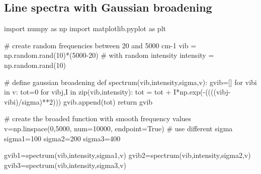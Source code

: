 \documentclass[
  letterpaper,
]{article}
\newenvironment{Shaded}{\begin{snugshade}}{\end{snugshade}}
\newcommand{\BuiltInTok}[1]{\textcolor[rgb]{0.00,0.23,0.31}{#1}}
\newcommand{\CommentTok}[1]{\textcolor[rgb]{0.37,0.37,0.37}{#1}}
\newcommand{\ControlFlowTok}[1]{\textcolor[rgb]{0.00,0.23,0.31}{#1}}
\newcommand{\DecValTok}[1]{\textcolor[rgb]{0.68,0.00,0.00}{#1}}
\newcommand{\ImportTok}[1]{\textcolor[rgb]{0.00,0.46,0.62}{#1}}
\newcommand{\KeywordTok}[1]{\textcolor[rgb]{0.00,0.23,0.31}{#1}}
\newcommand{\NormalTok}[1]{\textcolor[rgb]{0.00,0.23,0.31}{#1}}
\newcommand{\OperatorTok}[1]{\textcolor[rgb]{0.37,0.37,0.37}{#1}}
\newcommand{\VariableTok}[1]{\textcolor[rgb]{0.07,0.07,0.07}{#1}}
\begin{document}
\hypertarget{line-spectra-with-gaussian-broadening}{%
\subsection*{Line spectra with Gaussian
broadening}\label{line-spectra-with-gaussian-broadening}}


\begin{Shaded}
\begin{Highlighting}[]
\ImportTok{import}\NormalTok{ numpy }\ImportTok{as}\NormalTok{ np}
\ImportTok{import}\NormalTok{ matplotlib.pyplot }\ImportTok{as}\NormalTok{ plt}

\CommentTok{\# create random frequencies between 20 and 5000 cm{-}1 }
\NormalTok{vib }\OperatorTok{=}\NormalTok{ np.random.rand(}\DecValTok{10}\NormalTok{)}\OperatorTok{*}\NormalTok{(}\DecValTok{5000}\OperatorTok{{-}}\DecValTok{20}\NormalTok{)}
\CommentTok{\# with random intensity}
\NormalTok{intensity }\OperatorTok{=}\NormalTok{ np.random.rand(}\DecValTok{10}\NormalTok{)}

\CommentTok{\# define gaussian broadening}
\KeywordTok{def}\NormalTok{ spectrum(vib,intensity,sigma,v):}
\NormalTok{    gvib}\OperatorTok{=}\NormalTok{[]}
    \ControlFlowTok{for}\NormalTok{ vibi }\KeywordTok{in}\NormalTok{ v:}
\NormalTok{        tot}\OperatorTok{=}\DecValTok{0}
        \ControlFlowTok{for}\NormalTok{ vibj,I }\KeywordTok{in} \BuiltInTok{zip}\NormalTok{(vib,intensity):}
\NormalTok{            tot }\OperatorTok{=}\NormalTok{ tot }\OperatorTok{+}\NormalTok{ I}\OperatorTok{*}\NormalTok{np.exp(}\OperatorTok{{-}}\NormalTok{((((vibj}\OperatorTok{{-}}\NormalTok{vibi)}\OperatorTok{/}\NormalTok{sigma)}\OperatorTok{**}\DecValTok{2}\NormalTok{)))}
\NormalTok{        gvib.append(tot)}
    \ControlFlowTok{return}\NormalTok{ gvib}

\CommentTok{\# create the broaded function with smooth frequency values}
\NormalTok{v}\OperatorTok{=}\NormalTok{np.linspace(}\DecValTok{0}\NormalTok{,}\DecValTok{5000}\NormalTok{, num}\OperatorTok{=}\DecValTok{10000}\NormalTok{, endpoint}\OperatorTok{=}\VariableTok{True}\NormalTok{)}
\CommentTok{\# use different sigma}
\NormalTok{sigma1}\OperatorTok{=}\DecValTok{100}
\NormalTok{sigma2}\OperatorTok{=}\DecValTok{200}
\NormalTok{sigma3}\OperatorTok{=}\DecValTok{400}

\NormalTok{gvib1}\OperatorTok{=}\NormalTok{spectrum(vib,intensity,sigma1,v)}
\NormalTok{gvib2}\OperatorTok{=}\NormalTok{spectrum(vib,intensity,sigma2,v)}
\NormalTok{gvib3}\OperatorTok{=}\NormalTok{spectrum(vib,intensity,sigma3,v)}


\end{Highlighting}
\end{Shaded}
\end{document}
